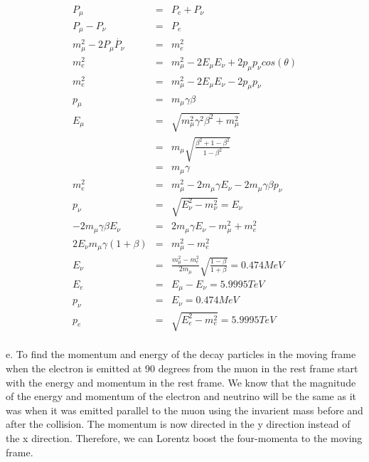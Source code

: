 \documentclass[11pt]{amsart}
\begin{document}
\begin{eqnarray*}
P_{\mu} &=& P_{e}+P_{\nu} \\
P_{\mu}-P_{\nu} &=& P_{e} \\
m_{\mu}^{2}-2P_{\mu}\dot{P_{\nu}} &=& m_{e}^{2}  \\
m_{e}^{2} &=& m_{\mu}^{2}-2E_{\mu}E_{\nu}+2p_{\mu}p_{\nu}cos(\theta) \\
m_{e}^{2} &=& m_{\mu}^{2}-2E_{\mu}E_{\nu}-2p_{\mu}p_{\nu} \\
p_{\mu} &=& m_{\mu}\gamma\beta \\
E_{\mu} &=& \sqrt{m_{\mu}^{2}\gamma^{2}\beta^{2}+m_{\mu}^{2}} \\
&=& m_{\mu}\sqrt{\frac{\beta^{2}+1-\beta^{2}}{1-\beta^{2}}} \\
&=& m_{\mu}\gamma \\
m_{e}^{2} &=& m_{\mu}^{2}-2m_{\mu}\gamma{E_{\nu}}-2m_{\mu}\gamma\beta{p_{\nu}}  \\
p_{\nu} &=& \sqrt{E_{\nu}^{2}-m_{\nu}^{2}} = E_{\nu} \\
-2m_{\mu}\gamma\beta{E_{\nu}} &=& 2m_{\mu}\gamma{E_{\nu}}-m_{\mu}^{2}+m_{e}^{2} \\
2E_{\nu}m_{\mu}\gamma(1+\beta) &=& m_{\mu}^{2}-m_{e}^{2} \\
E_{\nu} &=& \frac{m_{\mu}^{2}-m_{e}^{2}}{2m_{\mu}}\sqrt{\frac{1-\beta}{1+\beta}}=0.474MeV \\
E_{e} &=& E_{\mu}-E_{\nu} = 5.9995TeV \\
p_{\nu} &=& E_{\nu} =0.474MeV \\
p_{e} &=& \sqrt{E_{e}^{2}-m_{e}^{2}} = 5.9995TeV 
\end{eqnarray*} \\
e. To find the momentum and energy of the decay particles in the moving frame when the electron is emitted at 90 degrees from the muon in the rest frame start with the energy and momentum in the rest frame. We know that the magnitude of the energy and momentum of the electron and neutrino will be the same as it was when it was emitted parallel to the muon using the invarient mass before and after the collision. The momentum is now directed in the y direction instead of the x direction. Therefore, we can Lorentz boost the four-momenta to the moving frame. \\
\end{document}
